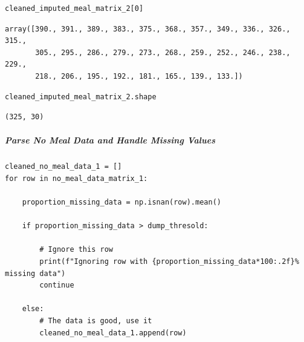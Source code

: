 \begin{verbatim}
cleaned_imputed_meal_matrix_2[0]
\end{verbatim}

\begin{verbatim}
array([390., 391., 389., 383., 375., 368., 357., 349., 336., 326., 315.,
       305., 295., 286., 279., 273., 268., 259., 252., 246., 238., 229.,
       218., 206., 195., 192., 181., 165., 139., 133.])
\end{verbatim}

\begin{verbatim}
cleaned_imputed_meal_matrix_2.shape
\end{verbatim}

\begin{verbatim}
(325, 30)
\end{verbatim}

\subparagraph{Parse No Meal Data and Handle Missing Values}

\begin{verbatim}
cleaned_no_meal_data_1 = []
for row in no_meal_data_matrix_1:

    proportion_missing_data = np.isnan(row).mean()

    if proportion_missing_data > dump_thresold:

        # Ignore this row
        print(f"Ignoring row with {proportion_missing_data*100:.2f}% missing data")
        continue

    else:
        # The data is good, use it
        cleaned_no_meal_data_1.append(row)
\end{verbatim}

